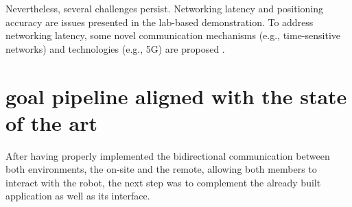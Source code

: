     Nevertheless, several challenges persist. Networking latency and positioning accuracy are issues presented in the lab-based demonstration. To address networking latency, some novel communication mechanisms (e.g., time-sensitive networks) and technologies (e.g., 5G) are proposed \cite{LI2022102321}. 

\section{goal pipeline aligned with the state of the art} %
After having properly implemented the bidirectional communication between both environments, the on-site and the remote, allowing both members to interact with the robot, the next step was to complement the already built application as well as its interface. 

